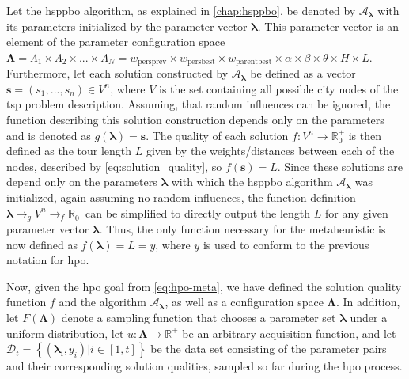 Let the \gls{hsppbo} algorithm, as explained in \cref{chap:hsppbo}, be denoted by $\mathcal{A}_\mathbf{\lambda}$ with its parameters initialized by the parameter vector $\mathbf{\lambda}$. This parameter vector is an element of the parameter configuration space $\mathbf{\Lambda} = \Lambda_1 \times \Lambda_2 \times ... \times \Lambda_N = w_{\text{persprev}} \times w_{\text{persbest}} \times w_{\text{parentbest}} \times \alpha \times \beta \times \theta \times H \times L$. Furthermore, let each solution constructed by $\mathcal{A}_\mathbf{\lambda}$ be defined as a vector $\mathbf{s} = (s_1,...,s_n) \in V^n$, where $V$ is the set containing all possible city nodes of the \gls{tsp} problem description. Assuming, that random influences can be ignored, the function describing this solution construction depends only on the parameters and is denoted as $g(\mathbf{\lambda}) = \mathbf{s}$. The quality of each solution $f : V^n \rightarrow \mathbb{R}_{0}^{+}$ is then defined as the tour length $L$ given by the weights/distances between each of the nodes, described by \cref{eq:solution_quality}, so $f(\mathbf{s}) = L$. Since these solutions are depend only on the parameters $\mathbf{\lambda}$ with which the \gls{hsppbo} algorithm $\mathcal{A}_\mathbf{\lambda}$ was initialized, again assuming no random influences, the function definition  $\mathbf{\lambda} \to_{g} V^n \to_{f} \mathbb{R}_{0}^{+}$ can be simplified to directly output the length $L$ for any given parameter vector $\mathbf{\lambda}$. Thus, the only function necessary for the metaheuristic is now defined as $f(\mathbf{\lambda}) = L = y$, where $y$ is used to conform to the previous notation for \gls{hpo}.

Now, given the \glsdesc{hpo} goal from \cref{eq:hpo-meta}, we have defined the solution quality function $f$ and the algorithm $\mathcal{A}_\mathbf{\lambda}$, as well as a configuration space $\mathbf{\Lambda} $. In addition, let $F(\mathbf{\Lambda})$ denote a sampling function that chooses a parameter set $\mathbf{\lambda}$ under a uniform distribution, let $u: \mathbf{\Lambda} \to \mathbb{R}^+$ be an arbitrary acquisition function, and let $\mathcal{D}_t = \left\lbrace (\mathbf{\lambda_i}, y_i) |  i\in [1,t] \right\rbrace $ be the data set consisting of the parameter pairs and their corresponding solution qualities, sampled so far during the \gls{hpo} process.

